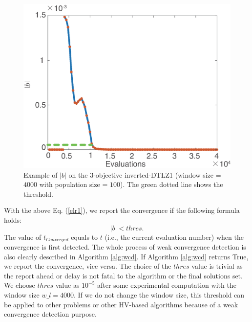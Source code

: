 \documentclass[conference]{IEEEtran}
\begin{document}
\begin{figure}[!t]
  \centering
    \includegraphics[width=\columnwidth]{FVEMOA_IDTLZ1_M3_nadir_2}
  \caption{Example of $\lvert b\rvert$ on the 3-objective inverted-DTLZ1
  (window size = $4000$ with population size = $100$).
  The green dotted line shows the threshold.
  }
  \label{wcd2}
\end{figure}

With the above Eq. (\ref{elr1}), we report the convergence if the following
formula holds:
\begin{equation}\label{elr2}
  \lvert b \rvert < thres. 
\end{equation}
The value of $t_{Converged}$ equals to $t$ (i.e., the current evaluation number) 
when the convergence is first detected. 
The whole process of weak convergence detection is also clearly described in Algorithm \ref{alg:wcd}. 
If Algorithm \ref{alg:wcd} returns True, we report the convergence, vice versa. 
The choice of the $thres$ value is trivial 
as the report ahead or delay is not fatal to the algorithm or the final solutions set.
We choose $thres$ value as $10^{-5}$ after some experimental computation with 
the window size $w\_ l = 4000$. 
If we do not change the window size, 
this threshold can be applied to other problems or other HV-based algorithms
because of a weak convergence detection purpose.
\end{document}
